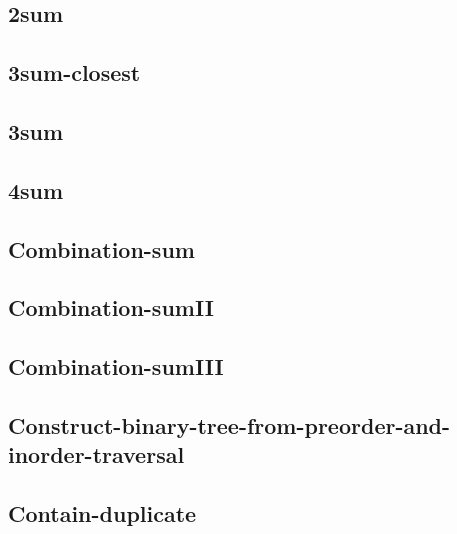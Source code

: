 \documentclass[a4paper,10pt]{article}
\begin{document}
\begin{CJK}{UTF8}{gbsn}     %

\else

\subsection{2sum}


\subsection{3sum-closest}


\subsection{3sum}


\subsection{4sum}


\subsection{Combination-sum}


\subsection{Combination-sumII}


\subsection{Combination-sumIII}


\subsection{Construct-binary-tree-from-preorder-and-inorder-traversal}


\subsection{Contain-duplicate}



\end{CJK}
\end{document}
